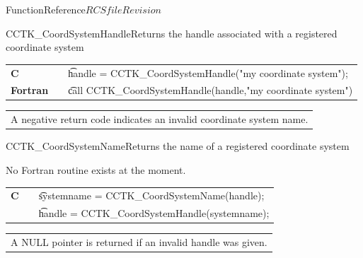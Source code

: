 \begin{cactuspart}{FunctionReference}{$RCSfile$}{$Revision$}
\begin{CCTKFunc}{CCTK\_CoordSystemHandle}{Returns the handle associated with a registered coordinate system}
\label{CCTK-CoordSystemHandle}
\showargs
\begin{params}
\end{params}
\begin{discussion}
\end{discussion}
\begin{examples}
\begin{tabular}{@{}p{3cm}cp{11cm}}
\hfill {\bf C} && {\t handle =  CCTK\_CoordSystemHandle("my coordinate system");}
\\
\hfill {\bf Fortran} && {\t call CCTK\_CoordSystemHandle(handle,"my coordinate system")}
\\
\end{tabular}
\end{examples}
\begin{errorcodes}
\begin{tabular}{l}
A negative return code indicates an invalid coordinate system name.
\end{tabular}
\end{errorcodes}
\end{CCTKFunc}

\begin{CCTKFunc}{CCTK\_CoordSystemName}{Returns the name of a registered coordinate system}
\label{CCTK-CoordSystemName}
\showcargs
\begin{params}
\end{params}
\begin{discussion}
No Fortran routine exists at the moment.
\end{discussion}
\begin{examples}
\begin{tabular}{@{}p{3cm}cp{11cm}}
\hfill {\bf C} && {\t systemname = CCTK\_CoordSystemName(handle);}
\\
\hfill         && {\t handle =  CCTK\_CoordSystemHandle(systemname);}
\end{tabular}
\end{examples}
\begin{errorcodes}
\begin{tabular}{l}
A NULL pointer is returned if an invalid handle was given.
\end{tabular}
\end{errorcodes}
\end{CCTKFunc}



\end{cactuspart}
